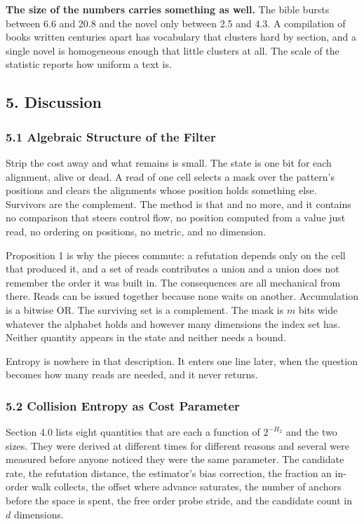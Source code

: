\textbf{The size of the numbers carries something as well.} The bible bursts between 6.6 and 20.8 and the novel only between 2.5 and 4.3. A compilation of books written centuries apart has vocabulary that clusters hard by section, and a single novel is homogeneous enough that little clusters at all. The scale of the statistic reports how uniform a text is.

\subsection{5. Discussion}

\subsubsection{5.1 Algebraic Structure of the Filter}

Strip the cost away and what remains is small. The state is one bit for each alignment, alive or dead. A read of one cell selects a mask over the pattern's positions and clears the alignments whose position holds something else. Survivors are the complement. The method is that and no more, and it contains no comparison that steers control flow, no position computed from a value just read, no ordering on positions, no metric, and no dimension.

Proposition 1 is why the pieces commute: a refutation depends only on the cell that produced it, and a set of reads contributes a union and a union does not remember the order it was built in. The consequences are all mechanical from there. Reads can be issued together because none waits on another. Accumulation is a bitwise OR. The surviving set is a complement. The mask is \(m\) bits wide whatever the alphabet holds and however many dimensions the index set has. Neither quantity appears in the state and neither needs a bound.

Entropy is nowhere in that description. It enters one line later, when the question becomes how many reads are needed, and it never returns.

\subsubsection{5.2 Collision Entropy as Cost Parameter}

Section 4.0 lists eight quantities that are each a function of \(2^{-H_2}\) and the two sizes. They were derived at different times for different reasons and several were measured before anyone noticed they were the same parameter. The candidate rate, the refutation distance, the estimator's bias correction, the fraction an in-order walk collects, the offset where advance saturates, the number of anchors before the space is spent, the free order probe stride, and the candidate count in \(d\) dimensions.

